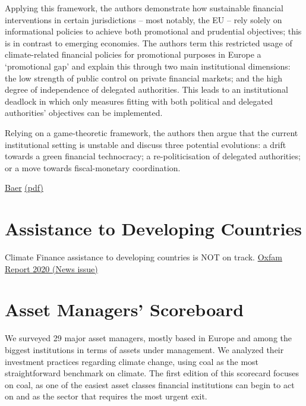 \documentclass[
]{book}
\begin{document}
Applying this framework, the authors demonstrate how sustainable financial interventions in certain jurisdictions -- most notably, the EU -- rely solely on informational policies to achieve both promotional and prudential objectives; this is in contrast to emerging economies. The authors term this restricted usage of climate-related financial policies for promotional purposes in Europe a `promotional gap' and explain this through two main institutional dimensions: the low strength of public control on private financial markets; and the high degree of independence of delegated authorities. This leads to an institutional deadlock in which only measures fitting with both political and delegated authorities' objectives can be implemented.

Relying on a game-theoretic framework, the authors then argue that the current institutional setting is unstable and discuss three potential evolutions: a drift towards a green financial technocracy; a re-politicisation of delegated authorities; or a move towards fiscal-monetary coordination.

\href{https://www.lse.ac.uk/granthaminstitute/publication/it-takes-two-to-dance-institutional-dynamics-and-climate-related-financial-policies/}{Baer}
\href{pdf/Baer_2021_Institutional_Climate_Policy_Dynamics.pdf}{(pdf)}

\hypertarget{assistance-to-developing-countries}{%
\section{Assistance to Developing Countries}\label{assistance-to-developing-countries}}

Climate Finance assistance to developing countries is NOT on track.
\href{news.html\#climate-finance-shadow-report-2020}{Oxfam Report 2020 (News issue)}

\hypertarget{asset-managers-scoreboard}{%
\section{Asset Managers' Scoreboard}\label{asset-managers-scoreboard}}

We surveyed 29 major asset managers, mostly based in Europe
and among the biggest institutions in terms of assets
under management. We analyzed their investment practices
regarding climate change, using coal as the most straightforward
benchmark on climate. The first edition of this scorecard focuses on
coal, as one of the easiest asset classes financial institutions can begin
to act on and as the sector that requires the most urgent exit.
\end{document}
